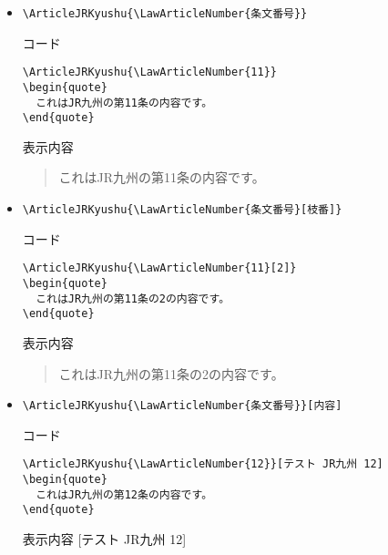 \documentclass[oneside,10pt,a4paper]{jsarticle}
\begin{document}
  \begin{itemize}
    \item \verb|\ArticleJRKyushu{\LawArticleNumber{条文番号}}|
      \begin{itembox}[l]{コード}
        {\footnotesize\begin{verbatim}
\ArticleJRKyushu{\LawArticleNumber{11}}
\begin{quote}
  これはJR九州の第11条の内容です。
\end{quote}\end{verbatim}}
      \end{itembox}
      \begin{itembox}[l]{表示内容}
        \begin{quote}
          これはJR九州の第11条の内容です。
        \end{quote}
      \end{itembox}
    \item \verb|\ArticleJRKyushu{\LawArticleNumber{条文番号}[枝番]}|
      \begin{itembox}[l]{コード}
        {\footnotesize\begin{verbatim}
\ArticleJRKyushu{\LawArticleNumber{11}[2]}
\begin{quote}
  これはJR九州の第11条の2の内容です。
\end{quote}\end{verbatim}}
      \end{itembox}
      \begin{itembox}[l]{表示内容}
        \begin{quote}
          これはJR九州の第11条の2の内容です。
        \end{quote}
      \end{itembox}
    \newpage
    \item \verb|\ArticleJRKyushu{\LawArticleNumber{条文番号}}[内容]|
      \begin{itembox}[l]{コード}
        {\footnotesize\begin{verbatim}
\ArticleJRKyushu{\LawArticleNumber{12}}[テスト JR九州 12]
\begin{quote}
  これはJR九州の第12条の内容です。
\end{quote}\end{verbatim}}
      \end{itembox}
      \begin{itembox}[l]{表示内容}
        [テスト JR九州 12]

\end{itembox}
\end{itemize}
\end{document}
